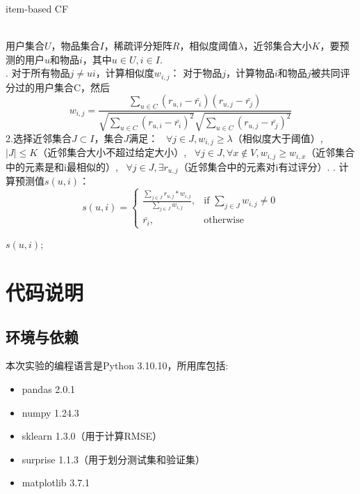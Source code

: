 \documentclass[12pt, a4paper]{ctexart}
\begin{document}
\begin{algorithm}[htb] 
\caption{item-based CF}
\label{alg:Framwork} 
\begin{algorithmic}
\REQUIRE ~~\\ %
用户集合$U$，物品集合$I$，稀疏评分矩阵$R$，相似度阈值$\lambda$，近邻集合大小$K$，要预测的用户$u$和物品$i$，其中$u\in U,i \in I$.
\ENSURE ~~\\ %

. 对于所有物品$j\neq ui$，计算相似度$w_{i,j}$：
\STATE 对于物品$j$，计算物品$i$和物品$j$被共同评分过的用户集合C，然后
$$w_{i,j} = 
\frac{\sum_{u\in C}{(r_{u,i} - \bar{r_i})(r_{u,j} - \bar{r_j})}}
{
\sqrt{\sum_{u\in C}{(r_{u,i} - \bar{r_i})}^2}
\sqrt{\sum_{u\in C}{(r_{u,j} - \bar{r_j})}^2}
}$$
\STATE 2.选择近邻集合$J\subset I$，集合$J$满足：
\STATE {}\ $\forall j \in J,w_{i,j}\geq \lambda$（相似度大于阈值）,
\STATE {}\ $\lvert J\lvert\leq K$（近邻集合大小不超过给定大小）,
\STATE {}\ $\forall j \in J,\forall x \not\in V, w_{i,j}\geq w_{i,x}$（近邻集合中的元素是和i最相似的）,
\STATE {}\ $\forall j \in J,\exists r_{u,j}$（近邻集合中的元素对i有过评分）.
. 计算预测值$s(u,i)$：
$$s(u,i) =
\begin{cases}
\frac{\sum_{j\in J}{r_{u,j}*w_{i,j}}}{\sum_{j\in J} w_{i,j}}, & \text{if } \sum_{j\in J} w_{i,j} \neq 0 \\
\bar{r_i}, & \text{otherwise}
\end{cases}$$

\RETURN $s(u,i)$; %
\end{algorithmic}
\end{algorithm}

\newpage
\section{代码说明}

\subsection{环境与依赖}
本次实验的编程语言是Python 3.10.10，所用库包括:
\begin{itemize}
    \item pandas 2.0.1
    \item numpy 1.24.3
    \item sklearn 1.3.0（用于计算RMSE）
    \item surprise 1.1.3（用于划分测试集和验证集）
    \item matplotlib 3.7.1
\end{itemize}
\end{document}
